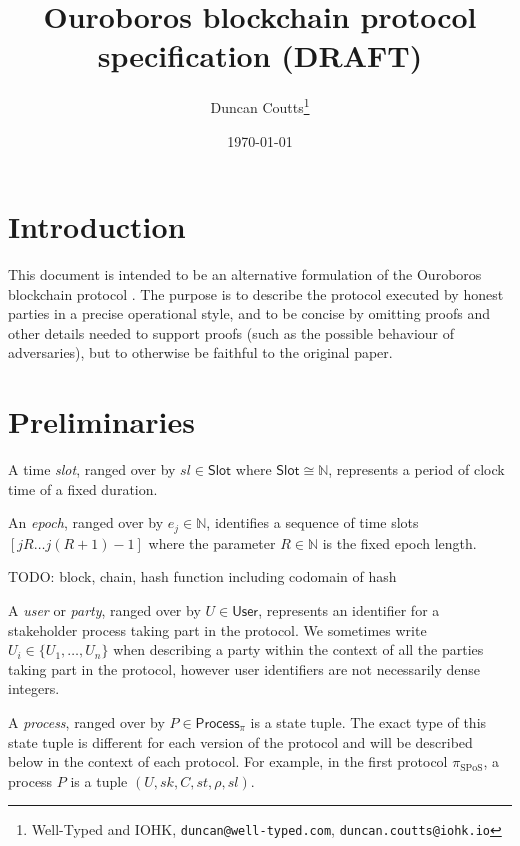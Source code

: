 \documentclass{article}
\newcommand{\sProcess}[4]{\left( U, sk, #1, #2, #3, #4 \right)}
\newcommand{\sChain}{C}
\newcommand{\sState}{st}
\newcommand{\sSlot}{sl}
\begin{document}
\title{Ouroboros blockchain protocol specification (DRAFT)}
\author{Duncan Coutts\footnote{Well-Typed and IOHK, \texttt{duncan@well-typed.com}, \texttt{duncan.coutts@iohk.io}}}
\date{\today}

\maketitle

\section{Introduction}

This document is intended to be an alternative formulation of the Ouroboros
blockchain protocol \cite{ouroboros}. The purpose is to describe the protocol
executed by honest parties in a precise operational style, and to be concise
by omitting proofs and other details needed to support proofs (such as the
possible behaviour of adversaries), but to otherwise be faithful to the
original paper.

\section{Preliminaries}

A time \emph{slot}, ranged over by $\sSlot \in \mathsf{Slot}$ where
$\mathsf{Slot} \cong \mathbb{N}$, represents a
period of clock time of a fixed duration.

An \emph{epoch}, ranged over by $e_j \in \mathbb{N}$, identifies a sequence of
time slots $[jR \ldots j(R+1) - 1]$ where the parameter $R \in \mathbb{N}$
is the fixed epoch length.

TODO: block, chain, hash function including codomain of hash

A \emph{user} or \emph{party}, ranged over by $U \in \mathsf{User}$,
represents an identifier for a stakeholder process taking part in the
protocol. We sometimes write $U_i \in \{U_1, \ldots, U_n \}$ when describing
a party within the context of all the parties taking part in the protocol,
however user identifiers are not necessarily dense integers.

A \emph{process}, ranged over by $P \in \mathsf{Process}_\pi$ is a
state tuple. The exact type of this state tuple is different for each version
of the protocol and will be described below in the context of each protocol.
For example, in the first protocol $\pi_{\text{SPoS}}$, a process
$P$ is a tuple $\sProcess{\sChain}{\sState}{\rho}{\sSlot}$.
\end{document}
